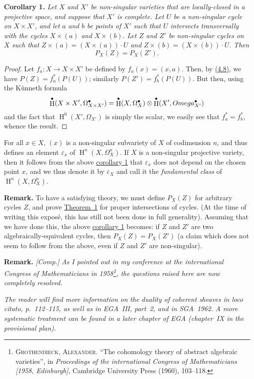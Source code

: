 \documentclass{article}
\newenvironment{itenv}[1]
  {\phantomsection\par\medskip\noindent\textbf{#1.}\itshape}
  {\medskip}
\newenvironment{rmenv}[1]
  {\phantomsection\par\medskip\noindent\textbf{#1.}\rmfamily}
  {\medskip}
\DeclareMathOperator{\HH}{H}
\newcommand{\oldpage}[1]{\marginpar{\footnotesize$\Big\vert$ \textit{p.~#1}}}
\begin{document}
\oldpage{149-13}
\begin{itenv}{Corollary 1}
\label{theorem1corollary1}
  Let $X$ and $X'$ be non-singular varieties that are locally-closed in a projective space, and suppose that $X'$ is complete.
  Let $U$ be a non-singular cycle on $X\times X'$, and let $a$ and $b$ be points of $X'$ such that $U$ intersects transversally with the cycles $X\times(a)$ and $X\times(b)$.
  Let $Z$ and $Z'$ be non-singular cycles on $X$ such that $Z\times(a)=(X\times(a))\cdot U$ and $Z\times(b)=(X\times(b))\cdot U$.
  Then
  \[
    P_X(Z) = P_X(Z').
  \]
\end{itenv}

\begin{proof}
  Let $f_a\colon X\to X\times X'$ be defined by $f_a(x)=(x,a)$.
  Then, by \hyperref[4.8]{(4.8)}, we have $P(Z)=f_a^*(P(U))$; similarly $P(Z')=f_b^*(P(U))$.
  But then, using the K\"{u}nneth formula
  \[
    \HH^\bullet(X\times X',\Omega_{X\times X'}^\bullet)
    = \HH^\bullet(X,\Omega_X^\bullet)\otimes\HH^\bullet(X',\\Omega_{X'}^\bullet)
  \]
  and the fact that $\HH^0(X',\Omega_{X'})$ is simply the scalar, we easily see that $f_a^*=f_b^*$, whence the result.
\end{proof}

For all $x\in X$, $(x)$ is a non-singular subvariety of $X$ of codimension $n$, and thus defines an element $\varepsilon_x$ of $\HH^n(X,\Omega_X^n)$.
If $X$ is a non-singular projective variety, then it follows from the above \hyperref[theorem1corollary1]{corollary 1} that $\varepsilon_x$ does not depend on the chosen point $x$, and we thus denote it by $\varepsilon_X$ and call it the \emph{fundamental class} of $\HH^n(X,\Omega_X^n)$.

\begin{rmenv}{Remark}
\label{section4remark}
  To have a satisfying theory, we must define $P_X(Z)$ for arbitrary cycles $Z$, and prove \hyperref[theorem1]{Theorem~1} for proper intersections of cycles.
  (At the time of writing this expos\'{e}, this has still not been done in full generality).
  Assuming that we have done this, the above \hyperref[theorem1corollary1]{corollary 1} becomes: if $Z$ and $Z'$ are two algebraically-equivalent cycles, then $P_X(Z)=P_X(Z')$ (a claim which does not seem to follow from the above, even if $Z$ and $Z'$ are non-singular).
\end{rmenv}

\begin{rmenv}{Remark}
  \emph{[Comp.]}
  \emph{As I pointed out in my conference at the international Congress of Mathematicians in 1958\footnote{\textsc{Grothendieck, Alexander.} ``The cohomology theory of abstract algebraic varieties'', in \emph{Proceedings of the international Congress of Mathematicians [1958, Edinburgh]}, Cambridge University Press (1960), 103--118.}, the questions raised here are now completely resolved.}

  \emph{The reader will find more information on the duality of coherent sheaves in \emph{loco citato}, p.~112--115, as well as in EGA~III, part~2, and in SGA~1962.}
  \emph{A more systematic treatment can be found in a later chapter of EGA (chapter~IX in the provisional plan).}
\end{rmenv}
\end{document}
